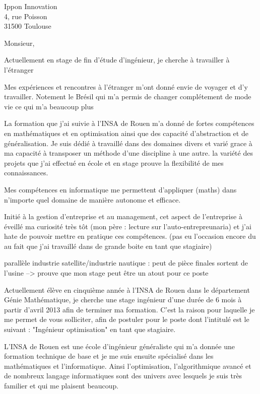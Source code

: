 \documentclass[12pt]{lettre}
\begin{document}
 
\begin{letter}{Ippon Innovation\\
4, rue Poisson\\
31500 Toulouse
}
\address{Victor Cameo Ponz\\47 rue Guynemer\\31200 Toulouse}
\nofax

\opening{Monsieur,}

Actuellement en stage de fin d'étude d'ingénieur, je cherche à travailler à l'étranger

Mes expériences et rencontres à l'étranger m'ont  donné envie de voyager et d'y travailler. Notement le Brésil qui m'a permis de changer complétement de mode vie ce qui m'a beaucoup plus

La formation que j'ai suivie à l'INSA de Rouen m'a donné de fortes compétences en mathématiques et en optimisation ainsi que des capacité d'abstraction et de généralisation. Je suis dédié à travaillé dans des domaines divers et varié grace à ma capacité à transposer un méthode d'une discipline à une autre. la variété des projets que j'ai effectué en école et en stage prouve la flexibilité de mes connaissances.

Mes compétences en informatique me permettent d'appliquer (maths) dans n'importe quel domaine de manière autonome et efficace.

Initié à la gestion d'entreprise et au management, cet aspect de l'entreprise à éveillé ma curiosité très tôt (mon père : lecture sur l'auto-entrepreunaria) et j'ai hate de pouvoir mettre en pratique ces compétences. (pas eu l'occasion encore du au fait que j'ai travaillé dans de grande boite en tant que stagiaire)

parallèle industrie satellite/industrie nautique : peut de pièce finales sortent de l'usine --> prouve que mon stage peut être un atout pour ce poste


Actuellement élève en cinquième année à l'INSA de Rouen dans le département Génie Mathématique, je cherche une stage ingénieur d'une durée de 6 mois à partir d'avril 2013 afin de terminer ma formation.
C'est la raison pour laquelle je me permet de vous solliciter, afin de postuler pour le poste dont l'intitulé est le suivant : "Ingénieur optimisation" en tant que stagiaire.

L'INSA de Rouen est une école d'ingénieur généraliste qui m'a donnée une formation technique de base et je me suis ensuite spécialisé dans les mathématiques et l'informatique. Ainsi l'optimisation, l'algorithmique avancé et de nombreux langage informatiques sont des univers avec lesquels je suis très familier et qui me plaisent beaucoup.


\end{letter}
\end{document}
